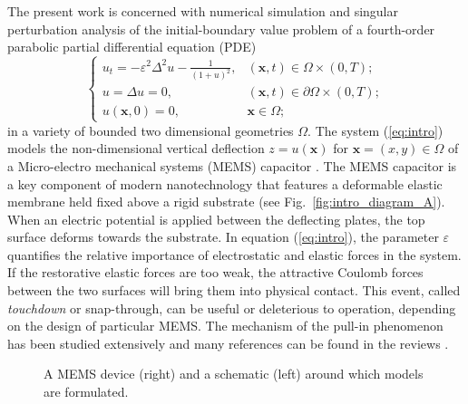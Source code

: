 \documentclass{siamart0516}
\renewcommand{\eqref}[1]{(\ref{#1})}
\newcommand{\eps}{\varepsilon}
\newcommand{\bx}{\mathbf{x}}
\newcommand{\ds}[0]{\displaystyle}
\theoremstyle{plain}%
\theoremstyle{definition}
\theoremstyle{remark}
\begin{document}
The present work is concerned with numerical simulation and singular perturbation analysis of the initial-boundary value problem of a fourth-order parabolic partial differential equation (PDE)
\begin{equation}\label{eq:intro}
\begin{cases}
u_t = - \eps^2 \Delta^2 u  - \ds\frac{1}{(1+u)^2}, & (\bx,t) \in\Omega \times(0,T);\\[5pt]
u = \Delta u = 0, & (\bx,t)\in\partial\Omega \times(0,T); \\[5pt]
u(\bx,0) = 0, & \bx \in \Omega;
\end{cases}
\end{equation}
in a variety of bounded two dimensional geometries $\Omega$. The system \eqref{eq:intro} models the non-dimensional vertical deflection $z = u(\bx)$ for $\bx = (x,y)\in\Omega$ of a Micro-electro mechanical systems (MEMS) capacitor \cite{Equilibrium2014,PB,Pelesko2002}. The MEMS capacitor is a key component of modern nanotechnology \cite{Tsai07,Beek2012,BatraReview} that features a deformable elastic membrane held fixed above a rigid substrate (see Fig.~\ref{fig:intro_diagram_A}). When an electric potential is applied between the deflecting plates, the top surface deforms towards the substrate. In equation \eqref{eq:intro}, the parameter $\eps$ quantifies the relative importance of electrostatic and elastic forces in the system. If the restorative elastic forces are too weak, the attractive Coulomb forces between the two surfaces will bring them into physical contact. This event, called {\em touchdown} or snap-through, can be useful or deleterious to operation, depending on the design of particular MEMS. The mechanism of the pull-in phenomenon has been studied extensively and many references can be found in the reviews \cite{BatraReview,ZHANG2014}.

\begin{figure}[htbp]
\centering
{}
\qquad
{}
\caption{A MEMS device (right) and a schematic (left) around which models are formulated. \label{fig:intro_diagram}}
\end{figure}
\end{document}
